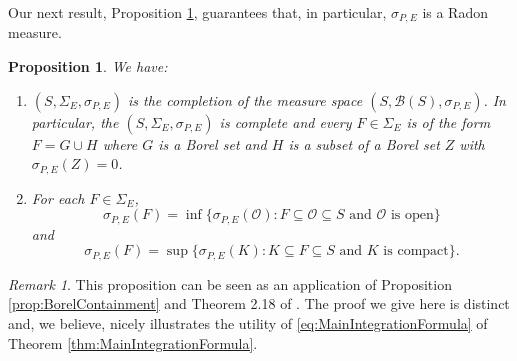 \documentclass[11pt]{article}
\newtheorem{proposition}[theorem]{Proposition}
\theoremstyle{remark}
\newtheorem{remark}{Remark}
\begin{document}
\noindent Our next result, Proposition \ref{prop:Regular}, guarantees that, in particular, $\sigma_{P,E}$ is a Radon measure. 

\begin{proposition}\label{prop:Regular}
We have:
\begin{enumerate}
    \item\label{item:Complete} $(S,\Sigma_E,\sigma_{P,E})$ is the completion of the measure space $(S,\mathcal{B}(S),\sigma_{P,E})$. In particular, the $(S,\Sigma_E,\sigma_{P,E})$ is complete and every $F\in \Sigma_E$ is of the form $F=G\cup H$ where $G$ is a Borel set and $H$ is a subset of a Borel set $Z$ with $\sigma_{P,E}(Z)=0$.
\item\label{item:Regular} For each $F\in\Sigma_E$,
\begin{equation}\label{eq:OuterRegular}
\sigma_{P,E}(F)=\inf\{\sigma_{P,E}(\mathcal{O}):F\subseteq\mathcal{O}\subseteq S\mbox{ and $\mathcal{O}$ is open}\}
\end{equation}
and
\begin{equation}
\sigma_{P,E}(F)=\sup\{\sigma_{P,E}(K):K\subseteq F\subseteq S\mbox{ and $K$ is compact}\}.
\end{equation}
\end{enumerate} 
\end{proposition}
\begin{remark}
This proposition can be seen as an application of Proposition \ref{prop:BorelContainment} and Theorem 2.18 of \cite{Rudin1987}. The proof we give here is distinct and, we believe, nicely illustrates the utility of \eqref{eq:MainIntegrationFormula} of Theorem \ref{thm:MainIntegrationFormula}.
\end{remark}
\end{document}
